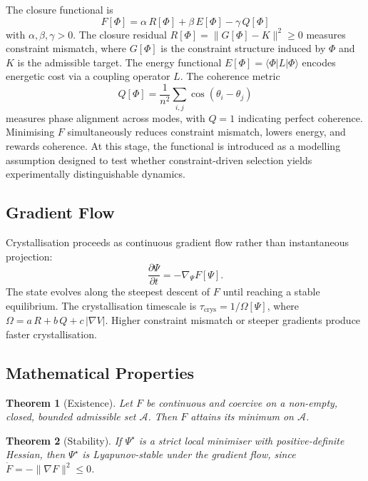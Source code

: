 \documentclass[12pt]{article}
\newtheorem{theorem}{Theorem}
\begin{document}
The closure functional is
\begin{equation}
F[\Phi] = \alpha\, R[\Phi] + \beta\, E[\Phi] - \gamma\, Q[\Phi]
\end{equation}
with $\alpha, \beta, \gamma > 0$. The closure residual $R[\Phi] = \|G[\Phi] - K\|^2 \geq 0$ measures constraint mismatch, where $G[\Phi]$ is the constraint structure induced by $\Phi$ and $K$ is the admissible target. The energy functional $E[\Phi] = \langle \Phi | L | \Phi \rangle$ encodes energetic cost via a coupling operator $L$. The coherence metric
\begin{equation}
Q[\Phi] = \frac{1}{n^2} \sum_{i,j} \cos(\theta_i - \theta_j)
\end{equation}
measures phase alignment across modes, with $Q = 1$ indicating perfect coherence. Minimising $F$ simultaneously reduces constraint mismatch, lowers energy, and rewards coherence. At this stage, the functional is introduced as a modelling assumption designed to test whether constraint-driven selection yields experimentally distinguishable dynamics.

\subsection{Gradient Flow}

Crystallisation proceeds as continuous gradient flow rather than instantaneous projection:
\begin{equation}
\frac{\partial \Psi}{\partial t} = -\nabla_\Psi F[\Psi].
\end{equation}
The state evolves along the steepest descent of $F$ until reaching a stable equilibrium. The crystallisation timescale is $\tau_{\mathrm{crys}} = 1/\Omega[\Psi]$, where $\Omega = a\,R + b\,Q + c\,|\nabla V|$. Higher constraint mismatch or steeper gradients produce faster crystallisation.

\subsection{Mathematical Properties}

\begin{theorem}[Existence]
Let $F$ be continuous and coercive on a non-empty, closed, bounded admissible set $\mathcal{A}$. Then $F$ attains its minimum on $\mathcal{A}$.
\end{theorem}

\begin{theorem}[Stability]
If $\Psi^{\star}$ is a strict local minimiser with positive-definite Hessian, then $\Psi^{\star}$ is Lyapunov-stable under the gradient flow, since $\dot{F} = -\|\nabla F\|^2 \leq 0$.
\end{theorem}
\end{document}
